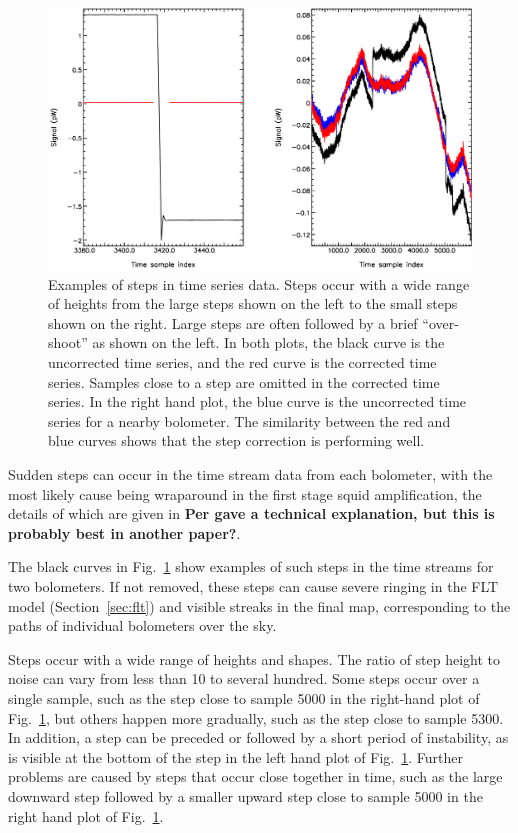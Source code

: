 \documentclass[useAMS,usenatbib,nofootinbib]{mn2e}
\begin{document}
\begin{figure}
\centering
\includegraphics[width=\linewidth]{steps1.pdf}
\caption{Examples of steps in time series data. Steps occur with a wide
range of heights from the large steps shown on the left to the small
steps shown on the right. Large steps are often followed by a brief
``over-shoot'' as shown on the left. In both plots, the black curve is
the uncorrected time series, and the red curve is the corrected time
series. Samples close to a step are omitted in the corrected time series.
In the right hand plot, the blue curve is the uncorrected time series for
a nearby bolometer. The similarity between the red and blue curves shows
that the step correction is performing well.
}
\label{fig:steps1}
\end{figure}

Sudden steps can occur in the time stream data from each bolometer,
with the most likely cause being wraparound in the first stage squid
amplification, the details of which are given in \citet{holland2012}
\textbf{Per gave a technical explanation, but this is probably best in
another paper?}.

The black curves in Fig.~\ref{fig:steps1} show examples of such steps in
the time streams for two bolometers. If not removed, these steps can
cause severe ringing in the FLT model (Section~\ref{sec:flt}) and visible
streaks in the final map, corresponding to the paths of individual
bolometers over the sky.

Steps occur with a wide range of heights and shapes. The ratio of step
height to noise can vary from less than 10 to several hundred. Some
steps occur over a single sample, such as the step close to sample
5000 in the right-hand plot of Fig.~\ref{fig:steps1}, but others
happen more gradually, such as the step close to sample 5300. In
addition, a step can be preceded or followed by a short period of
instability, as is visible at the bottom of the step in the left hand
plot of Fig.~\ref{fig:steps1}. Further problems are caused by steps
that occur close together in time, such as the large downward step
followed by a smaller upward step close to sample 5000 in the right
hand plot of Fig.~\ref{fig:steps1}.
\end{document}
